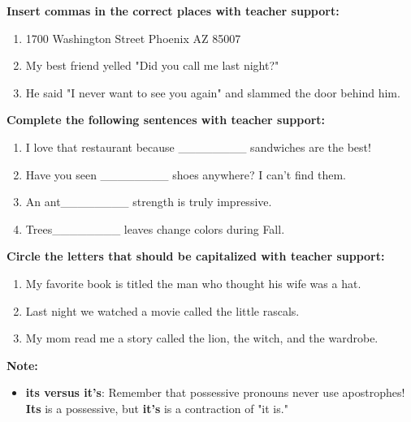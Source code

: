 \documentclass[12pt]{article}
\begin{document}
\begin{tcolorbox}[colframe=black!60, colback=white, 
coltitle=black, colbacktitle=black!15, fonttitle=\bfseries\Large, 
title=Guided Practice, halign title=center, left=10pt, right=10pt, top=10pt, bottom=15pt]
\textbf{Insert commas in the correct places with teacher support:}
\begin{enumerate}[itemsep=1em] %
    \item 1700 Washington Street Phoenix AZ 85007
    \item     My best friend yelled "Did you call me last night?"
    \item He said "I never want to see you again" and slammed the door behind him.


\end{enumerate}
\textbf{Complete the following sentences with teacher support:}
\begin{enumerate}[itemsep=1em]
\item I love that restaurant because \_\_\_\_\_\_\_\_ sandwiches are the best! 
\item Have you seen \_\_\_\_\_\_\_\_ shoes anywhere? I can't find them.
\item An ant\_\_\_\_\_\_\_\_ strength is truly impressive.
\item Trees\_\_\_\_\_\_\_\_ leaves change colors during Fall.
\end{enumerate}
\textbf{Circle the letters that should be capitalized with teacher support:}
\begin{enumerate}[itemsep=1em] %
    \item My favorite book is titled the man who thought his wife was a hat.
    \item     Last night we watched a movie called the little rascals.
    \item My mom read me a story called the lion, the witch, and the wardrobe.


\end{enumerate}
\end{tcolorbox}

\vspace{1em}

\begin{tcolorbox}[colframe=black!40, colback=gray!5, 
coltitle=black, colbacktitle=black!20, fonttitle=\bfseries\Large, 
title=Additional Notes, halign title=center, left=5pt, right=5pt, top=5pt, bottom=15pt]
\textbf{Note:}
\begin{itemize}
    \item \textbf{its versus it's}: Remember that possessive pronouns never use apostrophes! \textbf{Its} is a possessive, but \textbf{it's} is a contraction of "it is."


\end{itemize}
\end{tcolorbox}
\end{document}
